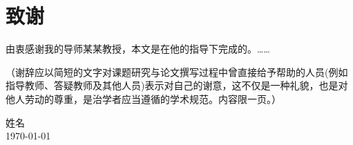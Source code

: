 \chapter{致谢}

由衷感谢我的导师某某教授，本文是在他的指导下完成的。……

（谢辞应以简短的文字对课题研究与论文撰写过程中曾直接给予帮助的人员(例如指导教师、答疑教师及其他人员)表示对自己的谢意，这不仅是一种礼貌，也是对他人劳动的尊重，是治学者应当遵循的学术规范。内容限一页。）

\vskip 108pt
\begin{flushright}
	姓名\makebox[1cm]{} \\
	\today
\end{flushright}

